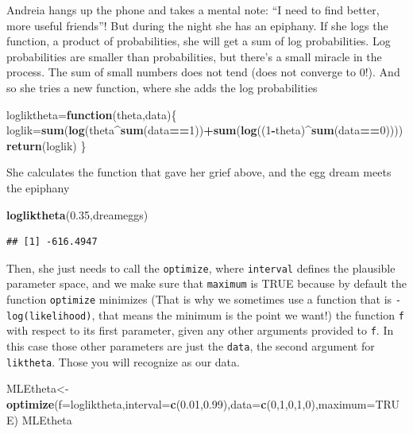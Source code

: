 \documentclass[
]{book}
\newenvironment{Shaded}{\begin{snugshade}}{\end{snugshade}}
\newcommand{\ControlFlowTok}[1]{\textcolor[rgb]{0.13,0.29,0.53}{\textbf{#1}}}
\newcommand{\DataTypeTok}[1]{\textcolor[rgb]{0.13,0.29,0.53}{#1}}
\newcommand{\DecValTok}[1]{\textcolor[rgb]{0.00,0.00,0.81}{#1}}
\newcommand{\FloatTok}[1]{\textcolor[rgb]{0.00,0.00,0.81}{#1}}
\newcommand{\KeywordTok}[1]{\textcolor[rgb]{0.13,0.29,0.53}{\textbf{#1}}}
\newcommand{\NormalTok}[1]{#1}
\newcommand{\OperatorTok}[1]{\textcolor[rgb]{0.81,0.36,0.00}{\textbf{#1}}}
\newcommand{\OtherTok}[1]{\textcolor[rgb]{0.56,0.35,0.01}{#1}}
\begin{document}
Andreia hangs up the phone and takes a mental note: ``I need to find better, more useful friends''! But during the night she has an epiphany. If she logs the function, a product of probabilities, she will get a sum of log probabilities. Log probabilities are smaller than probabilities, but there's a small miracle in the process. The sum of small numbers does not tend (does not converge to 0!). And so she tries a new function, where she adds the log probabilities

\begin{Shaded}
\begin{Highlighting}[]
\NormalTok{logliktheta=}\ControlFlowTok{function}\NormalTok{(theta,data)\{}
\NormalTok{  loglik=}\KeywordTok{sum}\NormalTok{(}\KeywordTok{log}\NormalTok{(theta}\OperatorTok{^}\KeywordTok{sum}\NormalTok{(data}\OperatorTok{==}\DecValTok{1}\NormalTok{))}\OperatorTok{+}\KeywordTok{sum}\NormalTok{(}\KeywordTok{log}\NormalTok{((}\DecValTok{1}\OperatorTok{-}\NormalTok{theta)}\OperatorTok{^}\KeywordTok{sum}\NormalTok{(data}\OperatorTok{==}\DecValTok{0}\NormalTok{))))}
  \KeywordTok{return}\NormalTok{(loglik)}
\NormalTok{\}}
\end{Highlighting}
\end{Shaded}

She calculates the function that gave her grief above, and the egg dream meets the epiphany

\begin{Shaded}
\begin{Highlighting}[]
\KeywordTok{logliktheta}\NormalTok{(}\FloatTok{0.35}\NormalTok{,dreameggs)}
\end{Highlighting}
\end{Shaded}

\begin{verbatim}
## [1] -616.4947
\end{verbatim}

Then, she just needs to call the \texttt{optimize}, where \texttt{interval} defines the plausible parameter space, and we make sure that \texttt{maximum} is TRUE because by default the function \texttt{optimize} minimizes (That is why we sometimes use a function that is \texttt{-log(likelihood)}, that means the minimum is the point we want!) the function \texttt{f} with respect to its first parameter, given any other arguments provided to \texttt{f}. In this case those other parameters are just the \texttt{data}, the second argument for \texttt{liktheta}. Those you will recognize as our data.

\begin{Shaded}
\begin{Highlighting}[]
\NormalTok{MLEtheta<-}\KeywordTok{optimize}\NormalTok{(}\DataTypeTok{f=}\NormalTok{logliktheta,}\DataTypeTok{interval=}\KeywordTok{c}\NormalTok{(}\FloatTok{0.01}\NormalTok{,}\FloatTok{0.99}\NormalTok{),}\DataTypeTok{data=}\KeywordTok{c}\NormalTok{(}\DecValTok{0}\NormalTok{,}\DecValTok{1}\NormalTok{,}\DecValTok{0}\NormalTok{,}\DecValTok{1}\NormalTok{,}\DecValTok{0}\NormalTok{),}\DataTypeTok{maximum=}\OtherTok{TRUE}\NormalTok{)}
\NormalTok{MLEtheta}
\end{Highlighting}
\end{Shaded}
\end{document}
